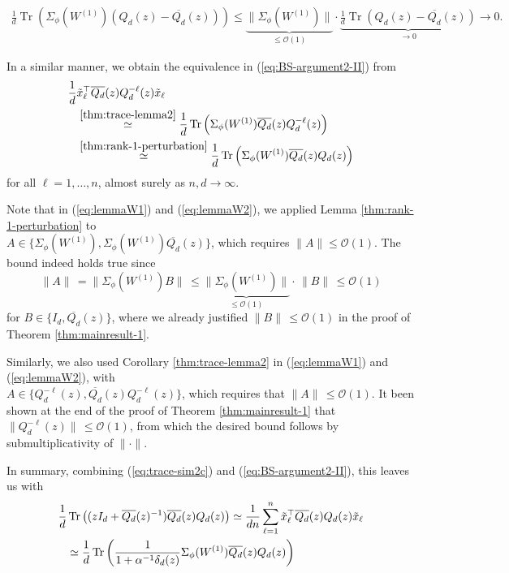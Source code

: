 \documentclass{article}
\begin{document}
\begin{align}
\frac{1}{d}\operatorname{Tr}\left(\Sigma_\phi(W^{(1)})(Q_d(z)-\overline{Q_d}(z))\right)\leq\underbrace{\|\Sigma_\phi(W^{(1)})\|}_{\leq\mathcal{O}(1)}\cdot\underbrace{\frac{1}{d}\operatorname{Tr}\left(Q_d(z)-\overline{Q_d}(z)\right)}_{\to0}\to0.
\end{align}
\par
In a similar manner, we obtain the equivalence in (\ref{eq:BS-argument2-II}) from
\begin{align}
\frac{1}{d}&\tilde{x}_\ell^\top\overline{Q_{d}}(z)Q_{d}^{-\ell}(z)\tilde{x}_\ell \notag
\\ &\stackrel{\ref{thm:trace-lemma2}}{\simeq} \frac{1}{d}\operatorname{Tr}\left(\Sigma_\phi(W^{(1)})\overline{Q_{d}}(z)Q_{d}^{-\ell}(z)\right) \notag
\\ &\stackrel{\ref{thm:rank-1-perturbation}}{\simeq} \frac{1}{d}\operatorname{Tr}\left(\Sigma_\phi(W^{(1)})\overline{Q_{d}}(z)Q_{d}(z)\right)\label{eq:lemmaW2}
\end{align}
for all $\ell=1,\dots,n$, almost surely as $n,d\to\infty$.
\bigskip
\par
Note that in (\ref{eq:lemmaW1}) and (\ref{eq:lemmaW2}), we applied Lemma \ref{thm:rank-1-perturbation} to 
\\ $A\in\{\Sigma_\phi(W^{(1)}),\Sigma_\phi(W^{(1)})\overline{Q_d}(z)\}$, which requires $\|A\|\leq\mathcal{O}(1)$. The bound indeed holds true since
\begin{equation}
\|A\|\,=\|\Sigma_\phi(W^{(1)})B\|\,\leq\underbrace{\|\Sigma_\phi(W^{(1)})\|}_{\leq\mathcal{O}(1)}\cdot\,\|B\|\,\leq\mathcal{O}(1)
\end{equation}
for $B\in\{I_d,\overline{Q_d}(z)\}$, where we already justified $\|B\|\,\leq\mathcal{O}(1)$ in the proof of Theorem \ref{thm:mainresult-1}.
\par
Similarly, we also used Corollary \ref{thm:trace-lemma2} 
 in (\ref{eq:lemmaW1}) and (\ref{eq:lemmaW2}), with 
 \\ $A\in\{Q_d^{-\ell}(z), \overline{Q_d}(z)Q_d^{-\ell}(z)\}$, which requires that $\|A\|\,\leq\mathcal{O}(1)$. It been shown at the end of the proof of Theorem \ref{thm:mainresult-1} that $\|Q_d^{-\ell}(z)\|\,\leq\mathcal{O}(1)$, from which the desired bound follows by submultiplicativity of $\|\cdot\|$.
\bigskip
\par
In summary, combining (\ref{eq:trace-sim2c}) and (\ref{eq:BS-argument2-II}), this leaves us with
\begin{align}
\frac{1}{d}&\operatorname{Tr}\left((zI_{d}+\overline{Q_{d}}(z)^{-1})\overline{Q_{d}}(z)Q_{d}(z)\right) \simeq \frac{1}{dn}\sum_{\ell=1}^n \tilde{x}_\ell^\top\overline{Q_{d}}(z)Q_{d}(z)\tilde{x}_\ell \notag
\\ &\simeq \frac{1}{d}\operatorname{Tr}\left(\frac{1}{1+\alpha^{-1}\delta_d(z)}\Sigma_\phi(W^{(1)})\overline{Q_{d}}(z)Q_{d}(z)\right)\label{eq:Q-identity2}
\end{align}
\end{document}
